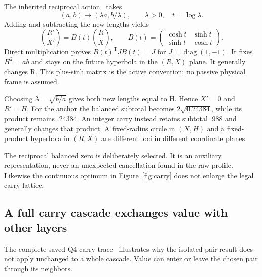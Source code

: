 \documentclass[11pt,a4paper]{article}
\newcommand{\diag}{\operatorname{diag}}
\newcommand{\tr}{\mathrm T}
\begin{document}
The inherited reciprocal action~\cite{ph03,multiplication} takes
\begin{equation}
(a,b)\mapsto(\lambda a,b/\lambda),\qquad \lambda>0,
\quad t=\log\lambda.
\label{eq:reciprocal}
\end{equation}
Adding and subtracting the new lengths yields
\begin{equation}
\binom{R'}{X'}=B(t)\binom RX,\qquad
B(t)=\begin{pmatrix}\cosh t&\sinh t\\\sinh t&\cosh t\end{pmatrix}.
\label{eq:B}
\end{equation}
Direct multiplication proves $B(t)^{\tr}JB(t)=J$ for $J=\diag(1,-1)$. It fixes $H^2=ab$ and stays on the future hyperbola in the $(R,X)$ plane. It generally changes R. This plus-sinh matrix is the active convention; no passive physical frame is assumed.

Choosing $\lambda=\sqrt{b/a}$ gives both new lengths equal to H. Hence $X'=0$ and $R'=H$. For the anchor the balanced subtotal becomes $2\sqrt{0.24384}$, while its product remains .24384. An integer carry instead retains subtotal .988 and generally changes that product. A fixed-radius circle in $(X,H)$ and a fixed-product hyperbola in $(R,X)$ are different loci in different coordinate planes.

The reciprocal balanced zero is deliberately selected. It is an auxiliary representation, never an unexpected cancellation found in the raw profile. Likewise the continuous optimum in Figure~\ref{fig:carry} does not enlarge the legal carry lattice.

\clearpage
\subsection{A full carry cascade exchanges value with other layers}
\label{sec:fullcarry}
The complete saved Q4 carry trace~\cite[Section 2]{ph02} illustrates why the isolated-pair result does not apply unchanged to a whole cascade. Value can enter or leave the chosen pair through its neighbors.
\end{document}

